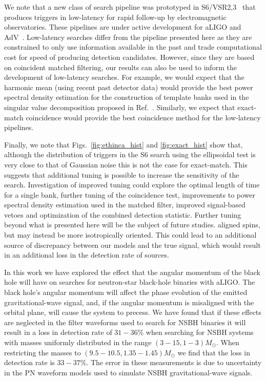 We note that a new class of search pipeline was prototyped in
S6/VSR2,3~\cite{Abbott:2011ys} that produces triggers in low-latency for rapid
follow-up by electromagnetic observatories. These pipelines are under
active development for aLIGO and AdV~\cite{Adams:MBTA,Cannon:2011vi}.
Low-latency searches differ from the pipeline presented here as they are constrained to
only use information available in the past and trade computational cost for
speed of producing detection candidates. However, since they are 
based on coincident matched filtering, our results can also be
used to inform the development of low-latency searches. For example, we would expect
that the harmonic mean (using recent past detector data) would provide the best
power spectral density estimation for the construction of template banks used
in the singular value decomposition proposed in Ref.~\cite{Cannon:2011vi}.
Similarly, we expect that exact-match coincidence would provide the best
coincidence method for the low-latency pipelines.

Finally, we note that Figs.~\ref{fig:ethinca_hist} and \ref{fig:exact_hist}
show that, although the distribution of triggers in the S6 search using the
ellipsoidal test is very close to that of Gaussian noise this is not the case
for exact-match. This suggests that additional tuning is possible to increase
the sensitivity of the search. Investigation of improved tuning could explore
the optimal length of time for a single bank, further tuning of the
coincidence test, improvements to power spectral density estimation used in
the matched filter, improved signal-based vetoes and optimization of the
combined detection statistic. Further tuning beyond what is presented here
will be the subject of future studies. 
aligned spins, but may instead be more isotropically oriented.
This could lead to an additional source of discrepancy between our models and
the true signal, which would result in an additional loss in the detection rate
of sources.


In this work we have explored the effect that the angular momentum of the black
hole will have on searches for neutron-star black-hole binaries with
\ac{aLIGO}. The black hole's angular momentum will affect the phase evolution
of the emitted gravitational-wave signal, and, if the angular momentum is
misaligned with the orbital plane, will cause the system to precess. We have
found that if these effects are neglected in the filter waveforms used to
search for \ac{NSBH} binaries it will result in a loss in detection rate of
$31-36\%$ when searching for \ac{NSBH} systems with masses uniformly 
distributed in the range 
$(3-15,1-3)M_{\odot}$. When restricting the masses to 
$(9.5-10.5,1.35-1.45)M_{\odot}$ we find that the loss in detection rate is
$33 - 37\%$. The error in these measurements is due to uncertainty in 
the \ac{PN} waveform models used to simulate \ac{NSBH} gravitational-wave 
signals.

